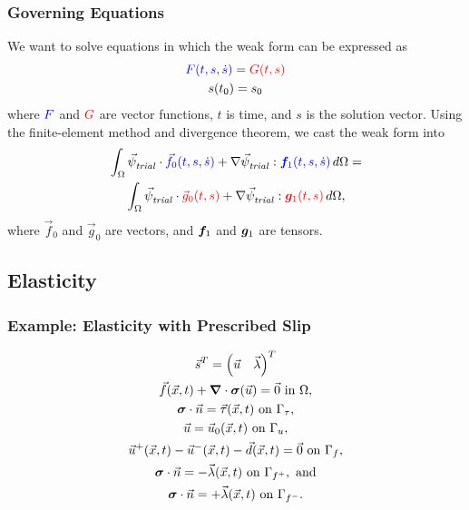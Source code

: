 \documentclass[aspectratio=169]{beamer}
\begin{document}
\begin{frame}
  \frametitle{Governing Equations}
  \summary{}

  We want to solve equations in which the weak form can be expressed
  as
  \begin{gather}
    {\color{blue}F(t,s,\dot{s})} = {\color{red}G(t,s)} \\
    s(t_0) = s_0
  \end{gather}
  where ${\color{blue}F}$ and ${\color{red}G}$ are vector functions, $t$ is time, and $s$ is the solution vector.
  \vfill
  Using the finite-element method and divergence theorem, we cast the weak form into
  \begin{multline}
    \int_\Omega {\vec{\psi}_\mathit{trial}^{}} \cdot {\color{blue}\vec{f}_0(t,s,\dot{s})} + \nabla {\vec{\psi}_\mathit{trial}^{}} : {\color{blue}\bm{f}
    _1(t,s,\dot{s})} \, 
    d\Omega = \\
    \int_\Omega {\vec{\psi}_\mathit{trial}^{}} \cdot {\color{red}\vec{g}_0(t,s)} + \nabla {\vec{\psi}_\mathit{trial}^{}} : {\color{red}\bm{g}_1(t,s)} \, 
    d\Omega,
  \end{multline}
  where $\vec{f}_0$ and $\vec{g}_0$ are vectors, and $\bm{f}_1$ and
  $\bm{g}_1$ are tensors.

\end{frame}

\subsection{Elasticity}

\begin{frame}
  \frametitle{Example: Elasticity with Prescribed Slip}



  \begin{gather}
    \vec{s}^T = \left( \vec{u} \quad \vec{\lambda} \right)^T \\
    \vec{f}(\vec{x},t) + \bm{\nabla} \cdot \bm{\sigma}(\vec{u}) = \vec{0} \text{ in }\Omega, \\
    \bm{\sigma} \cdot \vec{n} = \vec{\tau}(\vec{x},t) \text{ on }\Gamma_\tau, \\
    \vec{u} = \vec{u}_0(\vec{x},t) \text{ on }\Gamma_u, \\
    \vec{u}^+(\vec{x},t) - \vec{u}^-(\vec{x},t) - \vec{d}(\vec{x},t) = \vec{0} \text{ on }\Gamma_f,  \\
    \bm{\sigma} \cdot \vec{n} = -\vec{\lambda}(\vec{x},t) \text{ on }\Gamma_{f^+}, \text{ and}\\
    \bm{\sigma} \cdot \vec{n} = +\vec{\lambda}(\vec{x},t) \text{ on }\Gamma_{f^-}.
  \end{gather}

\end{frame}
\end{document}
